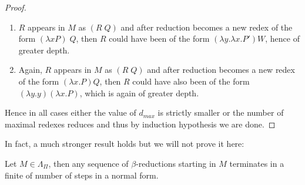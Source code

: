 \begin{proof}
\begin{enumerate}[a)]
\begin{enumerate}[1)]
                \item $R$ appears in $M$ as $(R\; Q)$ and
                after reduction becomes a new redex of the form $(\lambda x
                P)\; Q$, then $R$ could have been of the form $(\lambda y.
                \lambda x. P') W$, hence of greater depth.

                \item Again, $R$ appears in $M$ as $(R\; Q)$ and after reduction
                becomes a new redex of the form $(\lambda x. P) Q$, then $R$
                could have also been of the form $(\lambda y. y) (\lambda x.
                P)$, which is again of greater depth.
            \end{enumerate}
    \end{enumerate}
    Hence in all cases either the value of $d_{max}$ is strictly smaller or the
    number of maximal redexes reduces and thus by induction hypothesis we are
    done.
\end{proof}

In fact, a much stronger result holds but we will not prove it here:
\begin{theorem}
    Let $M \in \Lambda_\Pi$, then any sequence of $\beta$-reductions
    starting in $M$ terminates in a finite of number of steps in a normal form.
\end{theorem}
